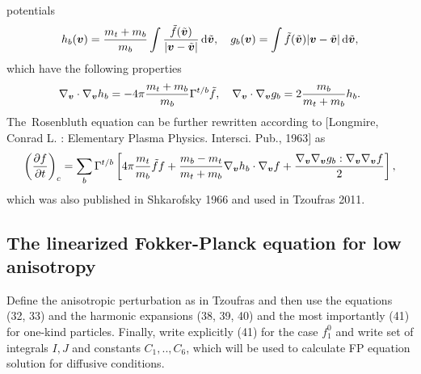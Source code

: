 potentials 
\begin{equation}
  h_{b}(\boldsymbol{v}) = \frac{m_t + m_b}{m_b}
  \int \frac{\tilde{f}(\tilde{\boldsymbol{v}})}{|\boldsymbol{v} - \tilde{\boldsymbol{v}}|}\, \text{d}\tilde{\boldsymbol{v}} ,
  \quad g_{b}(\boldsymbol{v}) = \int \tilde{f}(\tilde{\boldsymbol{v}})|\boldsymbol{v} - \tilde{\boldsymbol{v}}|\, \text{d}\tilde{\boldsymbol{v}} ,
  \nonumber
\end{equation}
which have the following properties
\begin{equation}
  \nabla_{\boldsymbol{v}}\cdot\nabla_{\boldsymbol{v}} h_{b} = 
  -4\pi \frac{m_t + m_b}{m_b} \Gamma^{t/b}\tilde{f} ,\quad
  \nabla_{\boldsymbol{v}}\cdot\nabla_{\boldsymbol{v}} g_{b} = 
  2 \frac{m_b}{m_t + m_b} h_{b} .
  \nonumber
\end{equation}
The~Rosenbluth equation  can be further rewritten
according to $[$Longmire, Conrad L. : Elementary Plasma Physics. Intersci. Pub., 1963$]$ as
\begin{equation}
  \left(\frac{\partial{f}}{\partial{t}}\right)_c = \sum_{b} \Gamma^{t/b} 
  \left[ 4\pi \frac{m_{t}}{m_b} \tilde{f} f 
  + \frac{m_b - m_t}{m_t + m_b} \nabla_{\boldsymbol{v}}h_{b}\cdot\nabla_{\boldsymbol{v}} f 
  + \frac{\nabla_{\boldsymbol{v}}\nabla_{\boldsymbol{v}}g_{b} : \nabla_{\boldsymbol{v}}\nabla_{\boldsymbol{v}} f}{2} \right] ,
  \label{eq:FP_Longmire}
\end{equation}
which was also published in Shkarofsky 1966 and used in Tzoufras 2011.


\subsection{The linearized Fokker-Planck equation for low anisotropy}
\label{sec:FP_linear}
Define the anisotropic perturbation as in Tzoufras and then use the equations
(32, 33) and the harmonic expansions (38, 39, 40) and the most importantly (41)
for one-kind particles. Finally, write explicitly (41) for the case $f_1^0$
and write set of integrals $I, J$ and constants $C_1, .., C_6$,
which will be used to calculate FP equation solution for diffusive conditions.

